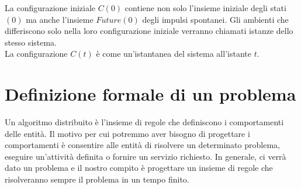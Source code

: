 La configurazione iniziale $C(0)$ contiene non solo l'insieme iniziale degli stati $(0)$ ma anche l'insieme $Future(0)$ degli impulsi spontanei. Gli ambienti che differiscono solo nella loro configurazione iniziale verranno chiamati istanze dello stesso sistema.\\
La configurazione $C(t)$ è come un'istantanea del sistema all'istante $t$.


\section{Definizione formale di un problema}
Un algoritmo distribuito è l'insieme di regole che definiscono i comportamenti delle entità. Il motivo per cui potremmo aver bisogno di progettare i comportamenti è consentire alle entità di risolvere un determinato problema, eseguire un'attività definita o fornire un servizio richiesto.
In generale, ci verrà dato un problema e il nostro compito è progettare un insieme di regole che risolveranno sempre il problema in un tempo finito.



